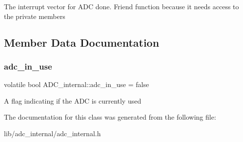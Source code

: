The interrupt vector for A\+DC done. Friend function because it needs access to the private members 

\subsection{Member Data Documentation}
\hypertarget{class_a_d_c__internal_a7313da9fa620eae7be708a58d35dbe71}{}\label{class_a_d_c__internal_a7313da9fa620eae7be708a58d35dbe71} 
\subsubsection{\texorpdfstring{adc\+\_\+in\+\_\+use}{adc\_in\_use}}
{\footnotesize\ttfamily volatile bool A\+D\+C\+\_\+internal\+::adc\+\_\+in\+\_\+use = false\hspace{0.3cm}{\ttfamily [private]}}

A flag indicating if the A\+DC is currently used 

The documentation for this class was generated from the following file\+:\begin{DoxyCompactItemize}
\item 
lib/adc\+\_\+internal/adc\+\_\+internal.\+h\end{DoxyCompactItemize}
